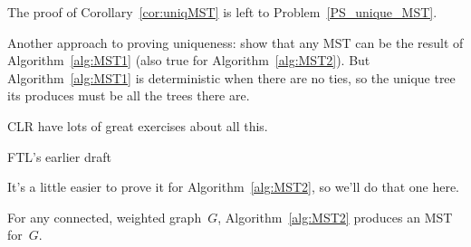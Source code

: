 The proof of Corollary~\ref{cor:uniqMST} is left to Problem~\ref{PS_unique_MST}.

\begin{editingnotes}
  Another approach to proving uniqueness: show that any MST can be the
  result of Algorithm~\ref{alg:MST1} (also true for
  Algorithm~\ref{alg:MST2}).  But Algorithm~\ref{alg:MST1} is
  deterministic when there are no ties, so the unique tree its
  produces must be all the trees there are.
\end{editingnotes}

\begin{editingnotes}
  CLR have lots of great exercises about all this.
\end{editingnotes}

\iffalse  FTL's earlier draft

It's a little easier
to prove it for Algorithm~\ref{alg:MST2}, so we'll do that one here.

\begin{theorem}\label{thm:MST2}
For any connected, weighted graph~$G$, Algorithm~\ref{alg:MST2}
produces an MST for~$G$.
\end{theorem}

